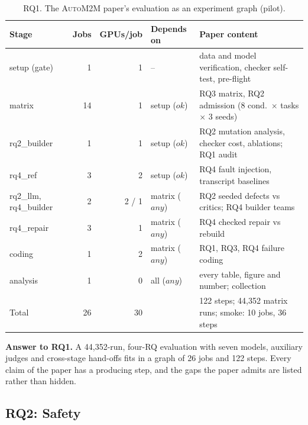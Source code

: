 \documentclass[pdflatex,sn-mathphys-num]{sn-jnl}
\theoremstyle{thmstyleone}%
\theoremstyle{thmstyletwo}%
\theoremstyle{thmstylethree}%
\newcommand{\auto}{\textsc{AutoM2M}}
\begin{document}
\begin{table}[t]
\centering\small
\caption{RQ1. The \auto{} paper's evaluation as an experiment graph (pilot).}\label{tab:pilot-graph}
\begin{tabularx}{\textwidth}{@{}l r r l X@{}}
\toprule
Stage & Jobs & GPUs/job & Depends on & Paper content \\
\midrule
setup (gate) & 1 & 1 & -- & data and model verification, checker self-test, pre-flight \\
matrix & 14 & 1 & setup ($\mathit{ok}$) & RQ3 matrix, RQ2 admission (8 cond.\ $\times$ tasks $\times$ 3 seeds) \\
rq2\_builder & 1 & 1 & setup ($\mathit{ok}$) & RQ2 mutation analysis, checker cost, ablations; RQ1 audit \\
rq4\_ref & 3 & 2 & setup ($\mathit{ok}$) & RQ4 fault injection, transcript baselines \\
rq2\_llm, rq4\_builder & 2 & 2 / 1 & matrix ($\mathit{any}$) & RQ2 seeded defects vs critics; RQ4 builder teams \\
rq4\_repair & 3 & 1 & matrix ($\mathit{any}$) & RQ4 checked repair vs rebuild \\
coding & 1 & 2 & matrix ($\mathit{any}$) & RQ1, RQ3, RQ4 failure coding \\
analysis & 1 & 0 & all ($\mathit{any}$) & every table, figure and number; collection \\
\midrule
Total & 26 & 30 & & 122 steps; 44{,}352 matrix runs; smoke: 10 jobs, 36 steps \\
\bottomrule
\end{tabularx}
\end{table}

\begin{tcolorbox}[enhanced, colback=modelbg, colframe=modelbar, boxrule=0.5pt, arc=1pt, left=6pt, right=6pt, top=3pt, bottom=3pt]
\small\textbf{Answer to RQ1.} A 44{,}352-run, four-RQ evaluation with seven
models, auxiliary judges and cross-stage hand-offs fits in a graph of 26 jobs
and 122 steps. Every claim of the paper has a producing step, and the gaps the
paper admits are listed rather than hidden.
\end{tcolorbox}

\subsection{RQ2: Safety}\label{sec:res-rq2}
\end{document}
